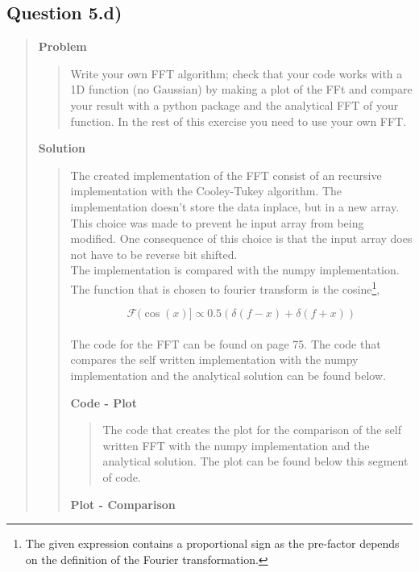 
\subsection*{\textbf{Question 5.d)}}
\begin{quote}

\textbf{Problem}
\begin{quote}
Write your own FFT algorithm; check that your code works with a 1D function (no Gaussian) by making a plot of the FFt and compare your result with a python package and the analytical FFT of your function. In the rest of this exercise you need to use your own FFT. 
\end{quote}

\textbf{Solution} 
\begin{quote}
The created implementation of the FFT consist of an recursive implementation with the Cooley-Tukey algorithm. The implementation doesn't store the data inplace, but in a new array. This choice was made to prevent he input array from being modified. One consequence of this choice is that the input array does not have to be reverse bit shifted. 
\\
The implementation is compared with the numpy implementation. The function that is chosen to fourier transform is the cosine\footnote{The given expression contains a proportional sign as the pre-factor depends on the definition of the Fourier transformation.},

\begin{equation}
\mathcal{F}(\cos(x) ]\propto 0.5(\delta(f - x) + \delta(f + x))
\end{equation}
\\
The code for the FFT can be found on page 75. The code that compares the self written implementation with the numpy implementation and the analytical solution can be found below.  
\newpage

%

\textbf{Code - Plot}
\begin{quote}
The code that creates the plot for the comparison of the self written FFT with the numpy implementation and the analytical solution. The plot can be found below this segment of code.

\end{quote}

\newpage
\textbf{Plot - Comparison}
\begin{quote}


\end{quote}
\end{quote}
\end{quote}
